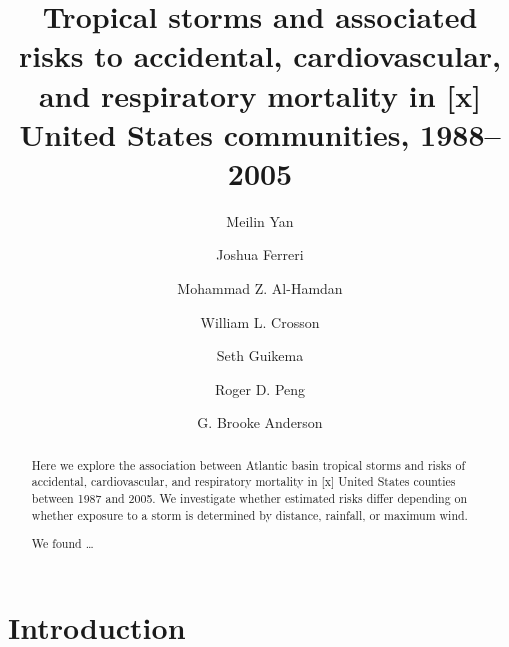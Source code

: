 \documentclass[]{elsarticle} %
\begin{document}
\begin{frontmatter}

  \title{Tropical storms and associated risks to accidental, cardiovascular, and
respiratory mortality in {[}x{]} United States communities, 1988--2005}
    \author[Colorado State University]{Meilin Yan}
  
    \author[Colorado State University]{Joshua Ferreri}
  
    \author[NASA Marshall Space Flight Center]{Mohammad Z. Al-Hamdan}
  
    \author[NASA Marshall Space Flight Center]{William L. Crosson}
  
    \author[University of Michigan]{Seth Guikema}
  
    \author[Johns Hopkins Bloomberg School of Public Health]{Roger D. Peng}
  
    \author[Colorado State University]{G. Brooke Anderson}
      \address[Colorado State University]{Department of Environmental \& Radiological Health Sciences, Lake
Street, Fort Collins, CO, 80525}
    \address[NASA Marshall Space Flight Center]{Universities Space Research Association, 320 Sparkman Dr., Huntsville,
AL, 35805}
    \address[University of Michigan]{Department of Industrial and Operations Engineering, 1205 Beal Ave., Ann
Arbor, MI, 48109}
    \address[Johns Hopkins Bloomberg School of Public Health]{Department of Biostatistics, 615 North Wolfe Street, Baltimore, MD,
21205}
  
  \begin{abstract}
  Here we explore the association between Atlantic basin tropical storms
  and risks of accidental, cardiovascular, and respiratory mortality in
  {[}x{]} United States counties between 1987 and 2005. We investigate
  whether estimated risks differ depending on whether exposure to a storm
  is determined by distance, rainfall, or maximum wind.
  
  We found \ldots{}
  \end{abstract}
  
 \end{frontmatter}

\section{Introduction}\label{introduction}
\end{document}
